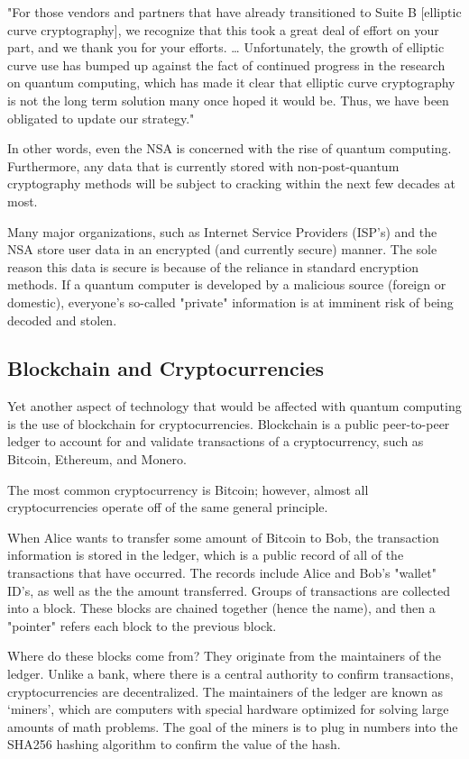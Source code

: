 \documentclass[10pt,journal,compsoc]{IEEEtran}
\begin{document}
"For those vendors and partners that have already transitioned to Suite B [elliptic curve cryptography], we recognize that this took a great deal of effort on your part, and we thank you for your efforts. … Unfortunately, the growth of elliptic curve use has bumped up against the fact of continued progress in the research on quantum computing, which has made it clear that elliptic curve cryptography is not the long term solution many once hoped it would be. Thus, we have been obligated to update our strategy."\cite{Information}

In other words, even the NSA is concerned with the rise of quantum computing. Furthermore, any data that is currently stored with non-post-quantum cryptography methods  will be subject to cracking within the next few decades at most. 

Many major organizations, such as Internet Service Providers (ISP's) and the NSA store user data in an encrypted (and currently secure) manner. The sole reason this data is secure is because of the reliance in standard encryption methods. If a quantum computer is developed by a malicious source (foreign or domestic), everyone's so-called "private" information is at imminent risk of being decoded and stolen. 

\subsection{Blockchain and Cryptocurrencies}
Yet another aspect of technology that would be affected with quantum computing is the use of blockchain for cryptocurrencies. Blockchain is a public peer-to-peer ledger to account for and validate transactions of a cryptocurrency, such as Bitcoin, Ethereum, and Monero. 

The most common cryptocurrency is Bitcoin; however, almost all cryptocurrencies operate off of the same general principle\cite{Bitcoin}. 

When Alice wants to transfer some amount of Bitcoin to Bob, the transaction information is stored in the ledger, which is a public record of all of the transactions that have occurred. The records include Alice and Bob's "wallet" ID's, as well as the the amount transferred. Groups of transactions are collected into a block. These blocks are chained together (hence the name), and then a "pointer" refers each block to the previous block. 

Where do these blocks come from? They originate  from the maintainers of the ledger. Unlike a bank, where there is a central authority to confirm transactions, cryptocurrencies are decentralized. The maintainers of the ledger are known as `miners', which are computers with special hardware optimized for solving large amounts of math problems\cite{Aggarwal}. The goal of the miners is to plug in numbers into the SHA256 hashing algorithm to confirm the value of the hash. 
\end{document}
